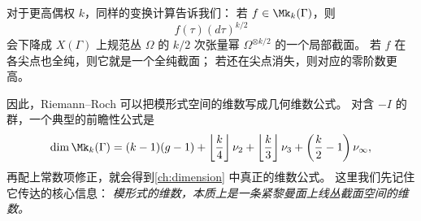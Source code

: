 对于更高偶权 $k$，同样的变换计算告诉我们：
若 $f\in\Mk_k(\Gamma)$，则
\[
  f(\tau)(d\tau)^{k/2}
\]
会下降成 $X(\Gamma)$ 上规范丛 $\Omega$ 的 $k/2$ 次张量幂
$\Omega^{\otimes k/2}$ 的一个局部截面。
若 $f$ 在各尖点也全纯，则它就是一个全纯截面；
若还在尖点消失，则对应的零阶数更高。



因此，Riemann--Roch 可以把模形式空间的维数写成几何维数公式。
对含 $-I$ 的群，一个典型的前瞻性公式是
\[
  \dim \Mk_k(\Gamma)
  =(k-1)(g-1)+\left\lfloor\frac{k}{4}\right\rfloor\nu_2
   +\left\lfloor\frac{k}{3}\right\rfloor\nu_3
   +\left(\frac{k}{2}-1\right)\nu_\infty,
\]
再配上常数项修正，就会得到\cref{ch:dimension} 中真正的维数公式。
这里我们先记住它传达的核心信息：
\emph{模形式的维数，本质上是一条紧黎曼面上线丛截面空间的维数。}
